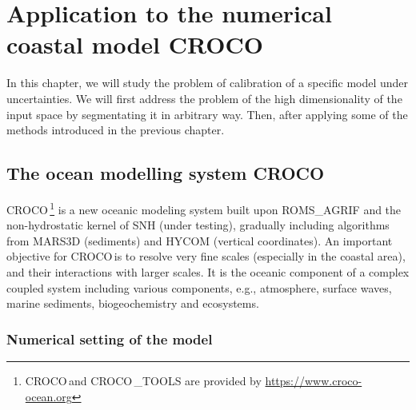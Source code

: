 \documentclass[../../Main_ManuscritThese.tex]{subfiles}
\newcommand{\CROCO}{CROCO\,}
\begin{document}
\chapter{Application to the numerical coastal model \CROCO}
\label{chap:croco}
\minitoc
\newpage
\subfileLocal{\pagestyle{contentStyle}}
In this chapter, we will study the problem of calibration of a specific model under uncertainties. We will first address the problem of the high dimensionality of the input space by segmentating it in arbitrary way. Then, after applying some of the methods introduced in the previous chapter.

\cite{boutet_estimation_2015}

\section{The ocean modelling system \CROCO}
\CROCO\footnote{\CROCO and \CROCO\_TOOLS are provided by  \url{https://www.croco-ocean.org}} is a new oceanic modeling system built upon ROMS\_AGRIF and the non-hydrostatic kernel of SNH (under testing), gradually including algorithms from MARS3D (sediments)  and HYCOM (vertical coordinates). An important objective for \CROCO is to resolve very fine scales (especially in the coastal area), and their interactions with larger scales. It is the oceanic component of a complex coupled system including various components, e.g., atmosphere, surface waves, marine sediments, biogeochemistry and ecosystems.
\cite{mcwilliams_irreducible_2007,zanna_ocean_2011}

\subsection{Numerical setting of the model}
\label{sec:geographical_setting}
\end{document}
